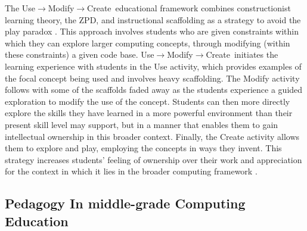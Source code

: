\documentclass[sigconf,manuscript,review,anonymous]{acmart} %
\def\umc{Use\begin{math}\rightarrow\end{math}Modify\begin{math}\rightarrow\end{math}Create\ }
\begin{document}
The \umc educational framework combines constructionist learning theory, the ZPD, and instructional scaffolding as a strategy to avoid the play paradox \cite{lee2011computational, franklin2020analysis}. This approach involves students who are given constraints within which they can explore larger computing concepts, through modifying (within these constraints) a given code base. \umc initiates the learning experience with students in the Use activity, which provides examples of the focal concept being used and involves heavy scaffolding. The Modify activity follows with some of the scaffolds faded away as the students experience a guided exploration to modify the use of the concept. Students can then more directly explore the skills they have learned in a more powerful environment than their present skill level may support, but in a manner that enables them to gain intellectual ownership in this broader context. Finally, the Create activity allows them to explore and play, employing the concepts in ways they invent. This strategy increases students’ feeling of ownership over their work and appreciation for the context in which it lies in the broader computing framework \cite{lee2011, lytle2019use}.

\subsection{Pedagogy In middle-grade Computing Education}
\end{document}
